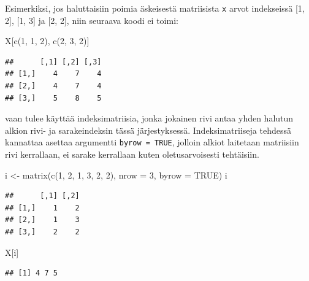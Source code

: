 \documentclass[
]{book}
\newenvironment{Shaded}{\begin{snugshade}}{\end{snugshade}}
\newcommand{\AttributeTok}[1]{\textcolor[rgb]{0.77,0.63,0.00}{#1}}
\newcommand{\ConstantTok}[1]{\textcolor[rgb]{0.00,0.00,0.00}{#1}}
\newcommand{\DecValTok}[1]{\textcolor[rgb]{0.00,0.00,0.81}{#1}}
\newcommand{\FunctionTok}[1]{\textcolor[rgb]{0.00,0.00,0.00}{#1}}
\newcommand{\NormalTok}[1]{#1}
\newcommand{\OtherTok}[1]{\textcolor[rgb]{0.56,0.35,0.01}{#1}}
\begin{document}
Esimerkiksi, jos haluttaisiin poimia äskeisestä matriisista \texttt{x} arvot indekseissä {[}1, 2{]}, {[}1, 3{]} ja {[}2, 2{]}, niin seuraava koodi ei toimi:

\begin{Shaded}
\begin{Highlighting}[]
\NormalTok{X[}\FunctionTok{c}\NormalTok{(}\DecValTok{1}\NormalTok{, }\DecValTok{1}\NormalTok{, }\DecValTok{2}\NormalTok{), }\FunctionTok{c}\NormalTok{(}\DecValTok{2}\NormalTok{, }\DecValTok{3}\NormalTok{, }\DecValTok{2}\NormalTok{)]}
\end{Highlighting}
\end{Shaded}

\begin{verbatim}
##      [,1] [,2] [,3]
## [1,]    4    7    4
## [2,]    4    7    4
## [3,]    5    8    5
\end{verbatim}

vaan tulee käyttää indeksimatriisia, jonka jokainen rivi antaa yhden halutun alkion rivi- ja sarakeindeksin tässä järjestyksessä. Indeksimatriiseja tehdessä kannattaa asettaa argumentti \texttt{byrow\ =\ TRUE}, jolloin alkiot laitetaan matriisiin rivi kerrallaan, ei sarake kerrallaan kuten oletusarvoisesti tehtäisiin.

\begin{Shaded}
\begin{Highlighting}[]
\NormalTok{i }\OtherTok{\textless{}{-}} \FunctionTok{matrix}\NormalTok{(}\FunctionTok{c}\NormalTok{(}\DecValTok{1}\NormalTok{, }\DecValTok{2}\NormalTok{, }\DecValTok{1}\NormalTok{, }\DecValTok{3}\NormalTok{, }\DecValTok{2}\NormalTok{, }\DecValTok{2}\NormalTok{), }\AttributeTok{nrow =} \DecValTok{3}\NormalTok{, }\AttributeTok{byrow =} \ConstantTok{TRUE}\NormalTok{)}
\NormalTok{i}
\end{Highlighting}
\end{Shaded}

\begin{verbatim}
##      [,1] [,2]
## [1,]    1    2
## [2,]    1    3
## [3,]    2    2
\end{verbatim}

\begin{Shaded}
\begin{Highlighting}[]
\NormalTok{X[i]}
\end{Highlighting}
\end{Shaded}

\begin{verbatim}
## [1] 4 7 5
\end{verbatim}
\end{document}
